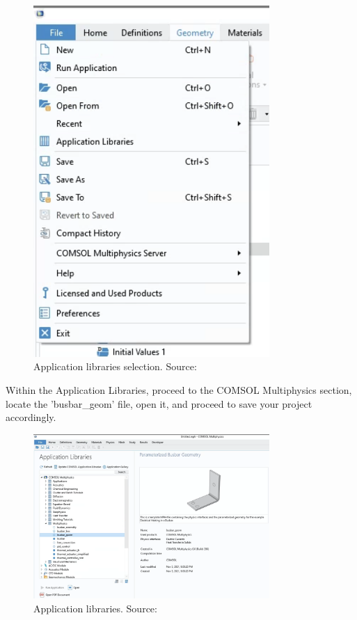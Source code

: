 \begin{figure}[H]
  \centering
  \includegraphics[width=0.8\textwidth]{Chapters/Figures/Chapter 3 Figures/Application Libraries Button.png}
  \caption{Application libraries selection. Source: \cite{multiphysics__modeling_nodate}}
  \label{fig:"application libraries" selection}
\end{figure}

Within the Application Libraries, proceed to the COMSOL Multiphysics section, locate the 'busbar\_geom' file, open it, and proceed to save your project accordingly.

\begin{figure}[H]
  \centering
  \includegraphics[width=0.8\textwidth]{Chapters/Figures/Chapter 3 Figures/Application Libraries.png}
  \caption{Application libraries. Source: \cite{multiphysics__modeling_nodate}}
  \label{fig:Application libraries}
\end{figure}

